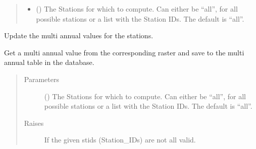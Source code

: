 \documentclass[letterpaper,10pt,english]{sphinxmanual}
\begin{document}
\begin{fulllineitems}
\begin{fulllineitems}
\begin{quote}
\begin{description}
\begin{itemize}
\item {} 
\sphinxAtStartPar
{} (\sphinxstyleliteralemphasis{\sphinxupquote{, }}) \textendash{} The Stations for which to compute.
Can either be “all”, for all possible stations
or a list with the Station IDs.
The default is “all”.

\end{itemize}

\end{description}\end{quote}

\end{fulllineitems}


\begin{fulllineitems}
\label{\detokenize{weatherDB:weatherDB.stations.StationsBase.update_ma}}
\sphinxAtStartPar
Update the multi annual values for the stations.

\sphinxAtStartPar
Get a multi annual value from the corresponding raster and save to the multi annual table in the database.
\begin{quote}\begin{description}
\item[{Parameters}] \leavevmode
\sphinxAtStartPar
{} (\sphinxstyleliteralemphasis{\sphinxupquote{, }}) \textendash{} The Stations for which to compute.
Can either be “all”, for all possible stations
or a list with the Station IDs.
The default is “all”.

\item[{Raises}] \leavevmode
\sphinxAtStartPar
{} \textendash{} If the given stids (Station\_IDs) are not all valid.

\end{description}\end{quote}


\end{fulllineitems}
\end{fulllineitems}
\end{document}
